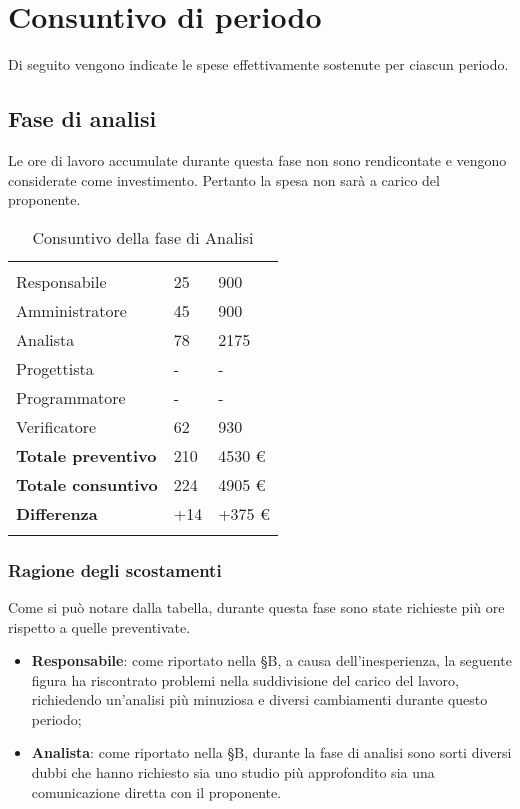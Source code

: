 \section{Consuntivo di periodo}

Di seguito vengono indicate le spese effettivamente sostenute per ciascun periodo.

\subsection{Fase di analisi}

Le ore di lavoro accumulate durante questa fase non sono rendicontate e vengono considerate come investimento. Pertanto la spesa non sarà a carico del proponente.

\begin{longtable}{ C{4cm} C{3cm} C{3.5cm}} 
 	 &
 	 &
 	 \\
 	
 	Responsabile & 25  & 900 \\
 	Amministratore & 45 & 900\\
 	Analista & 78  & 2175 \\
 	Progettista & - & -\\
 	Programmatore & - & -\\
 	Verificatore & 62 & 930\\
 	
	\hline 	
 	
 	\textbf{Totale preventivo} &
	210 &
 	4530 € \\		
 	
 	\textbf{Totale consuntivo} &
	224 &
 	4905 € \\	
 	
 	\textbf{Differenza} &
	+14 &
 	+375 € \\	
 	
 	\caption{Consuntivo della fase di Analisi}
\end{longtable}

\subsubsection{Ragione degli scostamenti}
Come si può notare dalla tabella, durante questa fase sono state richieste più ore rispetto a quelle preventivate.
\begin{itemize}
\item \textbf{Responsabile}: come riportato nella \S B, a causa dell'inesperienza, la seguente figura ha riscontrato problemi nella suddivisione del carico del lavoro, richiedendo un'analisi più minuziosa e diversi cambiamenti durante questo periodo;
\item \textbf{Analista}: come riportato nella \S B, durante la fase di analisi sono sorti diversi dubbi che hanno richiesto sia uno studio più approfondito sia una comunicazione diretta con il proponente.
\end{itemize}

